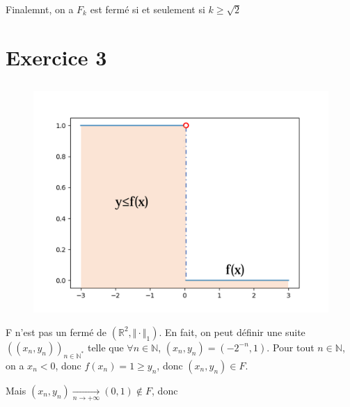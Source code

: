 \documentclass[a4paper,12pt]{book}
\begin{document}
Finalemnt, on a $F_k$ est fermé si et seulement si $\boxed{k \geq \sqrt{2}}$
\section{Exercice 3}
\subsection{}
\begin{figure}[h]
    \begin{center}
    \includegraphics[scale=0.3]{math90.png}
    \end{center}
\end{figure}
F n'est pas un fermé de $(\mathbb{R}^2,\Vert\cdot\Vert_1)$. En fait, on peut définir une suite $((x_n,y_n))_{n \in \mathbb{N}^*}$ telle que 
$\forall n \in \mathbb{N}$, $(x_n,y_n)=(-2^{-n},1)$. Pour tout $n \in \mathbb{N}$, on a $x_n <0$, donc $f(x_n)=1\geq y_n$, donc $(x_n,y_n) \in F$. 

Mais $(x_n,y_n) \xrightarrow[n \to +\infty]{}(0,1) \notin F$, donc  
\end{document}
